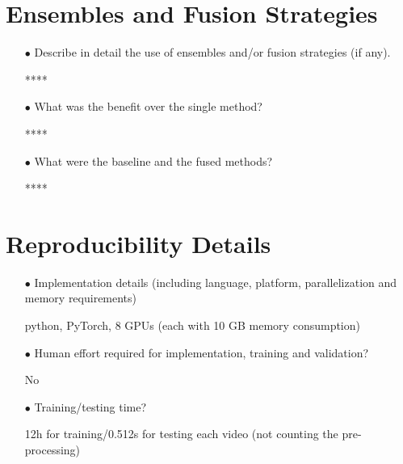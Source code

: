 \documentclass[runningheads]{llncs}
\begin{document}
\section{Ensembles and Fusion Strategies}
\begin{spacing}{1.5}
\begin{itemize}

\item[$\bullet$] Describe in detail the use of ensembles and/or fusion strategies (if any). 

****

\item[$\bullet$] What was the benefit over the single method?

****

\item[$\bullet$] What were the baseline and the fused methods?

****

\end{itemize}
\end{spacing}

\section{Reproducibility Details}
\begin{spacing}{1.5}
\begin{itemize}
\item[$\bullet$] Implementation details (including language, platform, parallelization and memory requirements)

python, PyTorch, 8 GPUs (each with 10 GB memory consumption)

\item[$\bullet$] Human effort required for implementation, training and validation?
 
No

\item[$\bullet$] Training/testing time?

12h for training/0.512s for testing each video (not counting the pre-processing)


\end{itemize}
\end{spacing}
\end{document}
